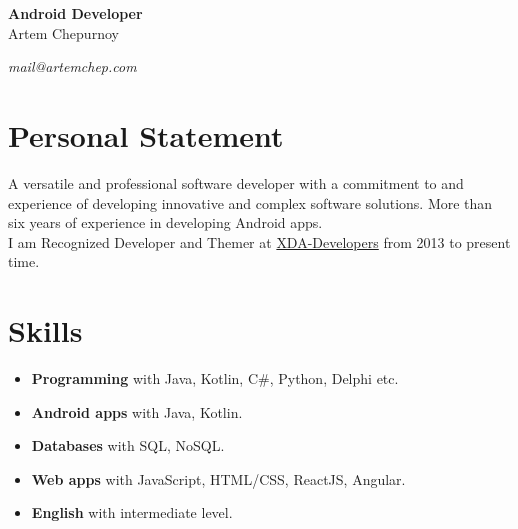 \documentclass[a4paper]{article}
\begin{document}
	\begin{center}
		{\huge\bfseries Android Developer} \\[1em]
		{\Large Artem Chepurnoy} \\[1em]
		\faMapMarker \quad \myaddress
	\end{center}
	\vspace{1em}
	\textit{\faPaperPlane \quad mail@artemchep.com} \hspace*{\fill} \textit{\faPhone \quad \myphone} 

	\section*{Personal Statement}
	A versatile and professional software developer with a commitment to and experience of developing innovative and complex software solutions. 
	More than six years of experience in developing Android apps. \\[1em]
	I am Recognized Developer and Themer at \href{https://forum.xda-developers.com/member.php?u=3685328}{XDA-Developers} from 2013 to present time.

	\section*{Skills}
	\begin{multicols}{2}
	\begin{itemize}
		\item \textbf{Programming} with Java, Kotlin, C\#, Python, Delphi etc.
		\item \textbf{Android apps} with Java, Kotlin.
		\item \textbf{Databases} with SQL, NoSQL.
		\item \textbf{Web apps} with JavaScript, HTML/CSS, ReactJS, Angular.
		\item \textbf{English} with intermediate level.
	\end{itemize}
	\end{multicols}
\end{document}
